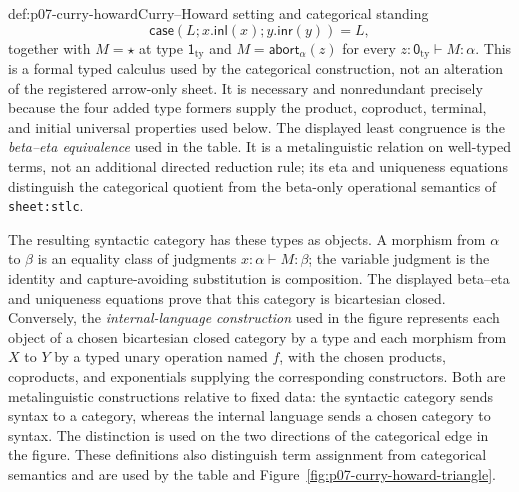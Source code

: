 \begin{hbdefinition}{def:p07-curry-howard}{Curry--Howard setting and categorical standing}
\[
 \mathsf{case}(L;x.\mathsf{inl}(x);y.\mathsf{inr}(y))=L,
\]
together with \(M=\star\) at type \(\mathsf 1_{\mathrm{ty}}\) and
\(M=\mathsf{abort}_{\alpha}(z)\) for every
\(z:\mathsf 0_{\mathrm{ty}}\vdash M:\alpha\).  This is a formal typed calculus used by the
categorical construction, not an alteration of the registered arrow-only
sheet.  It is necessary and nonredundant precisely because the four added type
formers supply the product, coproduct, terminal, and initial universal
properties used below.  The displayed least congruence is the
\emph{beta--eta equivalence} used in the table.  It is a metalinguistic
relation on well-typed terms, not an additional directed reduction rule; its
eta and uniqueness equations distinguish the categorical quotient from the
beta-only operational semantics of \texttt{sheet:stlc}.

The resulting syntactic category has these types as objects.  A morphism from
\(\alpha\) to \(\beta\) is an equality class of judgments
\(x{:}\alpha\vdash M{:}\beta\); the variable judgment is the identity and
capture-avoiding substitution is composition.  The displayed beta--eta and
uniqueness equations prove that this category is bicartesian closed.
Conversely, the \emph{internal-language construction} used in the figure
represents each object of a chosen bicartesian closed category by a type and
each morphism from \(X\) to \(Y\) by a typed unary operation named \(f\), with
the chosen products, coproducts, and exponentials supplying the corresponding
constructors.  Both
are metalinguistic constructions relative to fixed data: the syntactic
category sends syntax to a category, whereas the internal language sends a
chosen category to syntax.  The distinction is used on the two directions of
the categorical edge in the figure.  These definitions also distinguish
term assignment from categorical semantics and are used by the table and
Figure~\ref{fig:p07-curry-howard-triangle}.
\end{hbdefinition}


